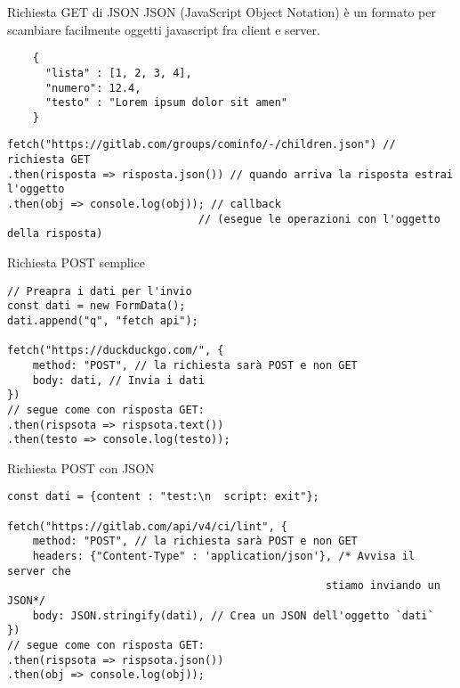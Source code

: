 \begin{frame}[fragile]{Richiesta GET di JSON}\transfade\centering
  JSON (JavaScript Object Notation) è un formato per scambiare facilmente oggetti javascript fra client e server.
  \smallskip
  \begin{verbatim}
    {
      "lista" : [1, 2, 3, 4],
      "numero": 12.4,
      "testo" : "Lorem ipsum dolor sit amen"
    }
  \end{verbatim}
  \bigskip\pause
  \begin{verbatim}
fetch("https://gitlab.com/groups/cominfo/-/children.json") // richiesta GET
.then(risposta => risposta.json()) // quando arriva la risposta estrai l'oggetto
.then(obj => console.log(obj)); // callback
                              // (esegue le operazioni con l'oggetto della risposta)
  \end{verbatim}
\end{frame}

\begin{frame}[fragile]{Richiesta POST semplice}\transfade\centering
  \begin{verbatim}
// Preapra i dati per l'invio
const dati = new FormData();
dati.append("q", "fetch api");

fetch("https://duckduckgo.com/", {
    method: "POST", // la richiesta sarà POST e non GET
    body: dati, // Invia i dati
})
// segue come con risposta GET:
.then(rispsota => rispsota.text())
.then(testo => console.log(testo));
  \end{verbatim}
\end{frame}

\begin{frame}[fragile]{Richiesta POST con JSON}\transfade\centering
  \begin{verbatim}
const dati = {content : "test:\n  script: exit"};

fetch("https://gitlab.com/api/v4/ci/lint", {
    method: "POST", // la richiesta sarà POST e non GET
    headers: {"Content-Type" : 'application/json'}, /* Avvisa il server che
                                                  stiamo inviando un JSON*/
    body: JSON.stringify(dati), // Crea un JSON dell'oggetto `dati`
})
// segue come con risposta GET:
.then(rispsota => rispsota.json())
.then(obj => console.log(obj));
  \end{verbatim}
\end{frame}